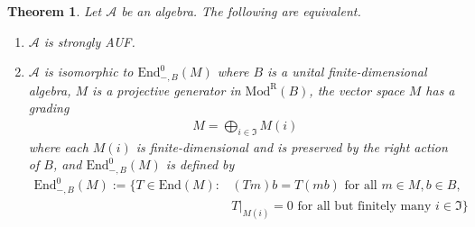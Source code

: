 \documentclass[11pt,b5paper,notitlepage]{article}
\theoremstyle{definition}
\theoremstyle{plain}
\newtheorem{thm}[df]{Theorem}
\newcommand{\fk}{\mathfrak}
\newcommand{\mc}{\mathcal}
\newcommand{\End}{\mathrm{End}} %
\newcommand{\ModR}{\mathrm{Mod}^{\mathrm R}}
\numberwithin{equation}{section}
\begin{document}
\begin{thm}\label{lb65}
Let $\mc A$ be an algebra. The following are equivalent.
\begin{enumerate}[label=(\arabic*)]
\item $\mc A$ is strongly AUF.
\item $\mc A$ is isomorphic to $\End^0_{-,B}(M)$ where $B$ is a unital finite-dimensional algebra, $M$ is a projective generator in $\ModR(B)$, the vector space $M$ has a grading
\begin{align*}
M=\bigoplus_{i\in\fk I}M(i)
\end{align*}
where each $M(i)$ is finite-dimensional and is preserved by the right action of $B$, and $\End^0_{-,B}(M)$ is defined by
\begin{align*}
\End^0_{-,B}(M):=\{T\in\End(M):&(Tm)b=T(mb)\text{ for all $m\in M,b\in B$,}\\
&T|_{M(i)}=0\text{ for all but finitely many }i\in\fk I \}
\end{align*}
\end{enumerate}
\end{thm}
\end{document}
